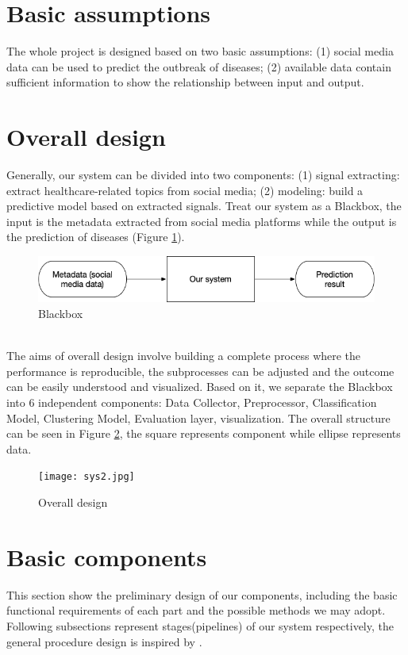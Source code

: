 \section{Basic assumptions}
The whole project is designed based on two basic assumptions: (1) social media data can be used to predict the outbreak of diseases; (2) available data contain sufficient information to show the relationship between input and output.

\section{Overall design}
\label{sec:Overall design}
Generally, our system can be divided into two components: (1) signal extracting: extract healthcare-related topics from social media; (2) modeling: build a predictive model based on extracted signals. Treat our system as a Blackbox, the input is the metadata extracted from social media platforms while the output is the prediction of diseases (Figure \ref{fig:sys1}). 
\begin{figure}[!htp]
    \center
    \includegraphics[width=5in]{images/system1.png}
    \caption{Blackbox}
    \label{fig:sys1}
\end{figure}
\\The aims of overall design involve building a complete process where the performance is reproducible, the subprocesses can be adjusted and the outcome can be easily understood and visualized. Based on it, we separate the Blackbox into 6 independent components: Data Collector, Preprocessor, Classification Model, Clustering Model, Evaluation layer, visualization. The overall structure can be seen in Figure \ref{fig:sys2}, the square represents component while ellipse represents data.
\begin{figure}[!htp]
    \center
    \texttt{[image: sys2.jpg]}
    \caption{Overall design}
    \label{fig:sys2}
\end{figure}
\section{Basic components}
This section show the preliminary design of our components, including the basic functional requirements of each part and the possible methods we may adopt. Following subsections represent stages(pipelines) of our system respectively, the general procedure design is inspired by \cite{feldman2007text}.
